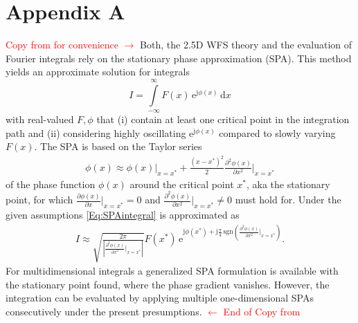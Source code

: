 \documentclass[a4paper,BCOR=15mm,10pt,twoside]{scrartcl}
\newcommand{\fscom}[2][red]{\textcolor{#1}{#2}}  %
\newcommand\e{\mathrm{e}}  %
\newcommand\im{\mathrm{j}}  %
\newcommand\fsd{\mathrm{d}}  %
\begin{document}
\section{Appendix A}
\fscom{Copy from \cite{Firtha2018} for convenience $\rightarrow$}
%
Both, the 2.5D WFS theory and the evaluation of Fourier integrals rely on the stationary phase approximation (SPA).
This method yields an approximate solution for integrals
\begin{equation}
\label{Eq:SPAintegral}
I = \int\limits_{-\infty}^{\infty} F(x) \, \e^{\im \phi(x)} \, \fsd x
\end{equation}
with real-valued $F,\phi$ that (i) contain at least one critical point in the integration path and (ii) considering highly oscillating $\e^{\im \phi(x)}$ compared to slowly varying $F(x)$. %
The SPA is based on the Taylor series
\begin{align}
\phi(x) \approx \phi(x)\big|_{x=x^*} + \frac{(x-x^*)^2}{2} \frac{\partial^2 \phi(x)}{\partial x^2}\bigg|_{x=x^*} 
\end{align} 
of the phase function $\phi(x)$ around the critical point $x^*$, aka the stationary point, for which $\frac{\partial \phi(x)}{\partial x}\big|_{x=x^*} = 0$ and $\frac{\partial^2 \phi(x)}{\partial x^2}\big|_{x=x^*} \neq 0$ must hold for.
Under the given assumptions \eqref{Eq:SPAintegral} is approximated as %
\begin{align}
\label{Eq:SPAResult}
I \approx \sqrt{\frac{2\pi}{| \frac{\partial^2 \phi(x)}{\partial x^2}\big|_{x=x^*}  |}} F(x^*) \, \e^{\im \phi(x^*) + \im \frac{\pi}{4}\,\mathrm{sgn}\left(  \frac{\partial^2 \phi(x)}{\partial x^2}\big|_{x=x^*}  \right)}.
\end{align}
For multidimensional integrals a generalized SPA formulation is available with the stationary point found, where the phase gradient vanishes. %
However, the integration can be evaluated by applying multiple one-dimensional SPAs consecutively under the present presumptions.
\fscom{$\leftarrow$ End of Copy from \cite{Firtha2018}}




\end{document}
